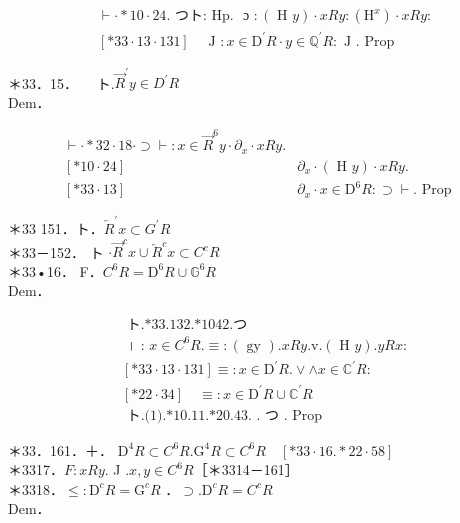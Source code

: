 \documentclass[10pt]{article}
\begin{document}
$$
\begin{aligned}
& \vdash \cdot * 10 \cdot 24 . \text { つト: Hp. } \text { ɔ }:(\text { H } y) \cdot x R y:\left(\mathrm{H}^{x}\right) \cdot x R y: \\
& {[* 33 \cdot 13 \cdot 131] \quad \text { J }: x \in \mathrm{D}^{\prime} R \cdot y \in \mathbb{Q}^{\prime} R: \text { J } \text {. Prop }}
\end{aligned}
$$

＊33．15．$\quad$ ト.$\vec{R}^{\prime} y \in D^{\prime} R$\\
Dem．

$$
\begin{array}{ll}
\vdash \cdot * 32 \cdot 18 \cdot \supset \vdash: x \in \vec{R}^{6} y \cdot \partial_{x} \cdot x R y . \\
{[* 10 \cdot 24]} & \partial_{x} \cdot(\text { H } y) \cdot x R y . \\
{[* 33 \cdot 13]} & \partial_{x} \cdot x \in \mathrm{D}^{6} R: \supset \vdash . \text { Prop }
\end{array}
$$

＊33 151．ト．$\overleftarrow{R}^{\prime} x \subset G^{\prime} R$\\
＊33－152． ト $\cdot \vec{R}^{c} x \cup \overleftarrow{R}^{c} x \subset C^{c} R$\\
＊33•16． F．$C^{6} R=\mathrm{D}^{6} R \cup \mathbb{G}^{6} R$\\
Dem．


\begin{align*}
& \text { ト.*33.132.*1042.つ } \\
& \text { । : } x \in C^{6} R . \equiv:(\text { gy }) . x R y . \mathrm{v} .(\text { H } y) . y R x: \\
& {[* 33 \cdot 13 \cdot 131] \equiv: x \in \mathrm{D}^{\prime} R . \vee \wedge x \in \mathbb{C}^{\prime} R:} \\
& {[* 22 \cdot 34] \quad \equiv: x \in \mathrm{D}^{\prime} R \cup \mathbb{C}^{\prime} R}  \tag{1}\\
& \text { ト.(1).*10.11.*20.43. } . \text { つ } \text {. Prop }
\end{align*}


＊33．161．＋． $\mathrm{D}^{4} R \subset C^{6} R . \mathrm{G}^{4} R \subset C^{6} R \quad[* 33 \cdot 16 . * 22 \cdot 58]$\\
＊3317．$F: x R y$. J $. x, y \in C^{6} R$［＊3314－161］\\
＊3318．$\leqslant: \mathrm{D}^{c} R=\mathrm{G}^{c} R$ ．$\supset . \mathrm{D}^{c} R=C^{c} R$\\
Dem．
\end{document}
